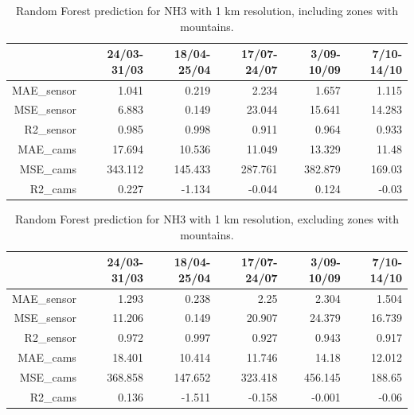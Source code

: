 \begin{table}[H]
\begin{tabular}{rrrrrr}
\hline
     &   24/03-31/03 &   18/04-25/04 &   17/07-24/07 &   3/09-10/09 &   7/10-14/10 \\
\hline
  MAE\_sensor   &            1.041 &            0.219 &            2.234 &            1.657 &            1.115 \\
  MSE\_sensor   &            6.883 &            0.149 &           23.044 &           15.641 &           14.283 \\
  R2\_sensor    &            0.985 &            0.998 &            0.911 &            0.964 &            0.933 \\
  MAE\_cams     &           17.694 &           10.536 &           11.049 &           13.329 &           11.48  \\
  MSE\_cams     &          343.112 &          145.433 &          287.761 &          382.879 &          169.03  \\
  R2\_cams      &            0.227 &           -1.134 &           -0.044 &            0.124 &           -0.03  \\
\hline
\end{tabular}
\caption{Random Forest prediction for NH3 with 1 km resolution, including zones with mountains.}
\end{table}


\begin{table}[H]
\begin{tabular}{rrrrrr}
\hline
     &   24/03-31/03 &   18/04-25/04 &   17/07-24/07 &   3/09-10/09 &   7/10-14/10 \\
\hline
  MAE\_sensor   &            1.293 &            0.238 &            2.25  &            2.304 &            1.504 \\
  MSE\_sensor   &           11.206 &            0.149 &           20.907 &           24.379 &           16.739 \\
  R2\_sensor    &            0.972 &            0.997 &            0.927 &            0.943 &            0.917 \\
  MAE\_cams     &           18.401 &           10.414 &           11.746 &           14.18  &           12.012 \\
  MSE\_cams     &          368.858 &          147.652 &          323.418 &          456.145 &          188.65  \\
  R2\_cams      &            0.136 &           -1.511 &           -0.158 &           -0.001 &           -0.06  \\
\hline
\end{tabular}
\caption{Random Forest prediction for NH3 with 1 km resolution, excluding zones with mountains.}
\end{table}


